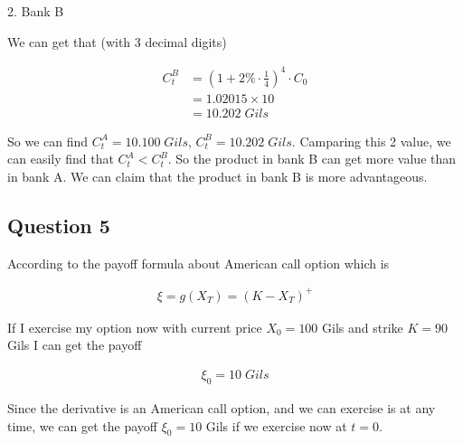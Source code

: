 \documentclass{report}
\begin{document}
\begin{spacing}{1.3541667}
\par 2. Bank B

We can get that (with 3 decimal digits) 

\begin{align*}
    C^{B}_t&={(1+2\%\cdot \frac{1}{4})}^{4} \cdot C_0\\
    &=1.02015 \times 10\\
    &=10.202\;Gils
\end{align*}

So we can find $\boxed{C^A_t=10.100\;Gils}$, $\boxed{C^B_t=10.202\;Gils}$. 
Camparing this 2 value, we can easily find that $C^A_t<C^B_t$. 
So the product in bank B can get more value than in bank A. 
We can claim that the product in bank B is more advantageous. 

\newpage

\begin{center}
    \section*{Question 5}
\end{center}

\par According to the payoff formula about American call option which is 

\begin{align*}
    \boxed{\xi=g(X_T)={(K-X_T)}^+}
\end{align*}

If I exercise my option now with current price $X_0=100$ Gils and strike $K=90$ Gils 
I can get the payoff 

\begin{align*}
    \boxed{\xi_0 = 10\;Gils}
\end{align*}

\par Since the derivative is an American call option, and we can exercise is at any time, 
we can get the payoff $\xi_0 =10$ Gils if we exercise now at $t=0$. 









\end{spacing}
\end{document}
